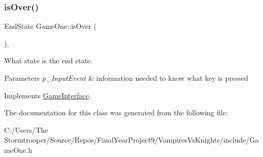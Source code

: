\subsubsection{\texorpdfstring{is\+Over()}{isOver()}}
{\footnotesize\ttfamily End\+State Game\+One\+::is\+Over (\begin{DoxyParamCaption}{ }\end{DoxyParamCaption})\hspace{0.3cm}{\ttfamily [override]}, {\ttfamily [virtual]}}



What state is the end state. 


\begin{DoxyParams}{Parameters}
{\em p\+\_\+\+Input\+Event} & information needed to know what key is pressed \\
\hline
\end{DoxyParams}


Implements \mbox{\hyperlink{class_game_interface_a5bad60f237214cb1ec013e221ed16f45}{Game\+Interface}}.



The documentation for this class was generated from the following file\+:\begin{DoxyCompactItemize}
\item 
C\+:/\+Users/\+The Stormtrooper/\+Source/\+Repos/\+Final\+Year\+Project9/\+Vampires\+Vs\+Knights/include/Game\+One.\+h\end{DoxyCompactItemize}
